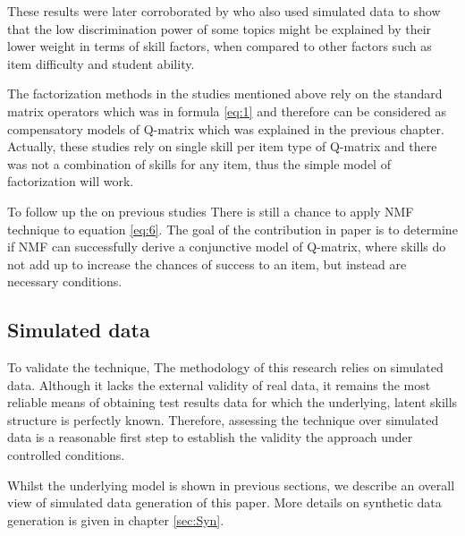 These results were later corroborated by \citet{desmarais2011conditions} who also used simulated data to show that the low discrimination power of some topics might be explained by their lower weight in terms of skill factors, when compared to other factors such as item difficulty and student ability.

The factorization methods in the studies mentioned above rely on the standard matrix operators which was in formula \ref{eq:1} and therefore can be considered as compensatory models of Q-matrix which was explained in the previous chapter. Actually, these studies rely on single skill per item type of Q-matrix and there was not a combination of skills for any item, thus the simple model of factorization will work. 

To follow up the on previous studies \citep{Barnes2005,desmarais2011conditions,Winters07} There is still a chance to apply NMF technique to equation \ref{eq:6}. The goal of the contribution in \citet{desmarais2012mapping} paper is to determine if NMF can successfully derive a conjunctive model of Q-matrix, where skills do not add up to increase the chances of success to an item, but instead are necessary conditions.


\subsection{Simulated data}
To validate the technique, The methodology of this research relies on simulated data. Although it lacks the external validity of real data, it remains the most reliable means of obtaining test results data for which the underlying, latent skills structure is perfectly known. Therefore, assessing the technique over simulated data is a reasonable first step to establish the validity the approach under controlled conditions. 

Whilst the underlying model  is shown in previous sections, we describe an overall view of simulated data generation of this paper. More details on synthetic data generation is given in chapter \ref{sec:Syn}.


